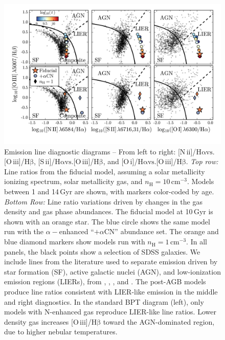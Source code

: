 \documentclass[preprint2]{aastex62}
\newcommand\vs{\ensuremath{\mathrm{vs.}}\xspace}
\newcommand{\nii}{[N\,{\sc ii}]\xspace}
\newcommand{\sii}{[S\,{\sc ii}]\xspace}
\newcommand{\oiii}{[O\,{\sc iii}]\xspace}
\newcommand{\oi}{[O\,{\sc i}]\xspace}
\newcommand{\ha}{\ensuremath{\mathrm{H\alpha}}\xspace}
\newcommand{\hb}{\ensuremath{\mathrm{H\beta}}\xspace}
\newcommand{\Gyr}{$\,$Gyr\xspace}
\newcommand{\alphaCN}{\ensuremath{+\alpha\mathrm{CN}}\xspace}
\begin{document}
\begin{figure}
  \begin{center}
    \includegraphics[width=\linewidth]{figs/f5.png}
    \caption{{\sc Emission line diagnostic diagrams --} From left to right: \nii/\ha \vs \oiii/\hb, \sii/\ha \vs \oiii/\hb, and  \oi/\ha \vs \oiii/\hb. \emph{Top row:} Line ratios from the fiducial model, assuming a solar metallicity ionizing spectrum, solar metallicity gas, and $n_{\mathrm{H}}=10$\,cm$^{-3}$. Models between 1 and 14\Gyr are shown, with markers color-coded by age. \emph{Bottom Row:} Line ratio variations driven by changes in the gas density and gas phase abundances. The fiducial model at 10\Gyr is shown with an orange star. The blue circle shows the same model run with the $\alpha-$enhanced ``\alphaCN'' abundance set. The orange and blue diamond markers show models run with $n_{\mathrm{H}}=1$\,cm$^{-3}$. In all panels, the black points show a selection of SDSS galaxies. We include lines from the literature used to separate emission driven by star formation (SF), active galactic nuclei (AGN), and low-ionization emission regions (LIERs), from \citet{Kewley+2001}, \citet{Kauffmann+2003b}, \citet{Kewley+2006}, and \citet{CidFernandes+2010}. The post-AGB models produce line ratios consistent with LIER-like emission in the middle and right diagnostics. In the standard BPT diagram (left), only models with N-enhanced gas reproduce LIER-like line ratios. Lower density gas increases \oiii/\hb toward the AGN-dominated region, due to higher nebular temperatures.}
    \label{fig:BPT}
  \end{center}
\end{figure}
\end{document}
